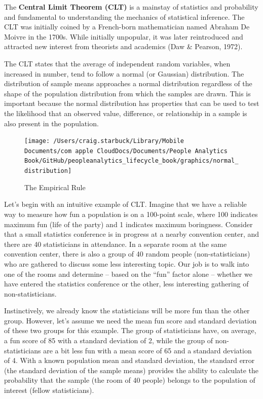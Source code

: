\documentclass[]{book}
\begin{document}
The \textbf{Central Limit Theorem (CLT)} is a mainstay of statistics and probability and fundamental to understanding the mechanics of statistical inference. The CLT was initially coined by a French-born mathematician named Abraham De Moivre in the 1700s. While initially unpopular, it was later reintroduced and attracted new interest from theorists and academics (Daw \& Pearson, 1972).

The CLT states that the average of independent random variables, when increased in number, tend to follow a normal (or Gaussian) distribution. The distribution of sample means approaches a normal distribution regardless of the shape of the population distribution from which the samples are drawn. This is important because the normal distribution has properties that can be used to test the likelihood that an observed value, difference, or relationship in a sample is also present in the population.

\begin{figure}

{\centering \texttt{[image: /Users/craig.starbuck/Library/Mobile Documents/com~apple~CloudDocs/Documents/People Analytics Book/GitHub/peopleanalytics\_lifecycle\_book/graphics/normal\_distribution]} 

}

\caption{The Empirical Rule}\label{fig:emp-rule}
\end{figure}

Let's begin with an intuitive example of CLT. Imagine that we have a reliable way to measure how fun a population is on a 100-point scale, where 100 indicates maximum fun (life of the party) and 1 indicates maximum boringness. Consider that a small statistics conference is in progress at a nearby convention center, and there are 40 statisticians in attendance. In a separate room at the same convention center, there is also a group of 40 random people (non-statisticians) who are gathered to discuss some less interesting topic. Our job is to walk into one of the rooms and determine -- based on the ``fun'' factor alone -- whether we have entered the statistics conference or the other, less interesting gathering of non-statisticians.

Instinctively, we already know the statisticians will be more fun than the other group. However, let's assume we need the mean fun score and standard deviation of these two groups for this example. The group of statisticians have, on average, a fun score of 85 with a standard deviation of 2, while the group of non-statisticians are a bit less fun with a mean score of 65 and a standard deviation of 4. With a known population mean and standard deviation, the standard error (the standard deviation of the sample means) provides the ability to calculate the probability that the sample (the room of 40 people) belongs to the population of interest (fellow statisticians).
\end{document}
